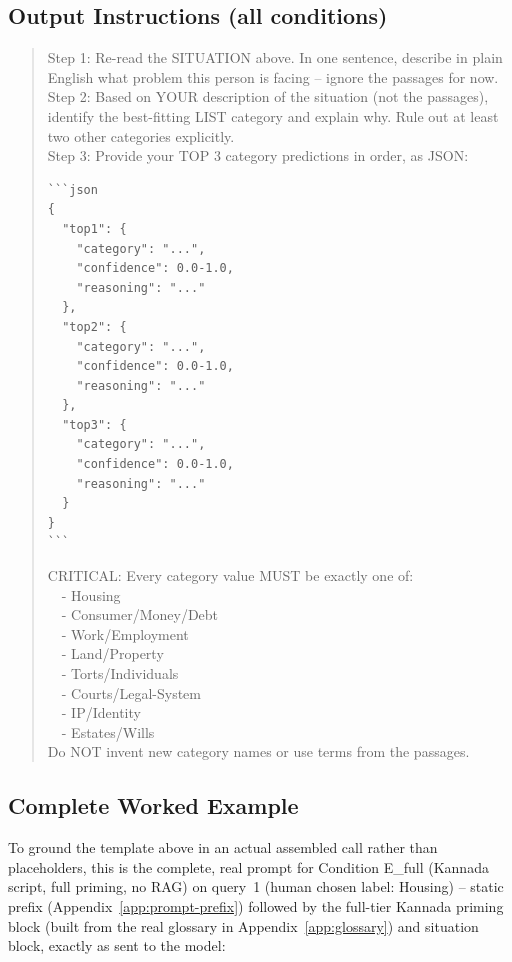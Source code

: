 \documentclass[11pt]{article}
\begin{document}
\subsection{Output Instructions (all conditions)}
\label{app:prompt-output}

\begin{quote}
\ttfamily\small
Step 1: Re-read the SITUATION above. In one sentence, describe in plain English what problem this person is facing -- ignore the passages for now.\\
Step 2: Based on YOUR description of the situation (not the passages), identify the best-fitting LIST category and explain why. Rule out at least two other categories explicitly.\\
Step 3: Provide your TOP 3 category predictions in order, as JSON:
{\footnotesize
\begin{verbatim}
```json
{
  "top1": {
    "category": "...",
    "confidence": 0.0-1.0,
    "reasoning": "..."
  },
  "top2": {
    "category": "...",
    "confidence": 0.0-1.0,
    "reasoning": "..."
  },
  "top3": {
    "category": "...",
    "confidence": 0.0-1.0,
    "reasoning": "..."
  }
}
```
\end{verbatim}
}
CRITICAL: Every category value MUST be exactly one of:\\
\ \ - Housing\\
\ \ - Consumer/Money/Debt\\
\ \ - Work/Employment\\
\ \ - Land/Property\\
\ \ - Torts/Individuals\\
\ \ - Courts/Legal-System\\
\ \ - IP/Identity\\
\ \ - Estates/Wills\\
Do NOT invent new category names or use terms from the passages.
\end{quote}

\subsection{Complete Worked Example}
\label{app:prompt-worked}

To ground the template above in an actual assembled call rather than
placeholders, this is the complete, real prompt for Condition E\_full
(Kannada script, full priming, no RAG) on query~1 (human chosen label: Housing) --
static prefix (Appendix~\ref{app:prompt-prefix}) followed by the full-tier
Kannada priming block (built from the real glossary in
Appendix~\ref{app:glossary}) and situation block, exactly as sent to the
model:
\end{document}
